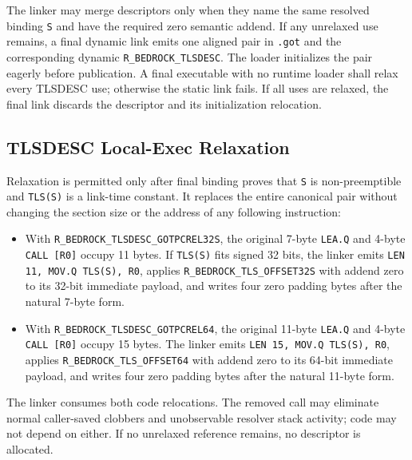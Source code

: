 \documentclass[10pt,twoside]{article}
\begin{document}
The linker may merge descriptors only when they name the same resolved binding
\texttt{S} and have the required zero semantic addend. If any unrelaxed use
remains, a final dynamic link emits one aligned pair in \texttt{.got} and the
corresponding dynamic \texttt{R\_BEDROCK\_TLSDESC}. The loader initializes the
pair eagerly before publication. A final executable with no runtime loader
shall relax every TLSDESC use; otherwise the static link fails. If all uses are
relaxed, the final link discards the descriptor and its initialization
relocation.

\subsection{TLSDESC Local-Exec Relaxation}
Relaxation is permitted only after final binding proves that \texttt{S} is
non-preemptible and \texttt{TLS(S)} is a link-time constant. It replaces the
entire canonical pair without changing the section size or the address of any
following instruction:
\begin{itemize}\raggedright
\item With \texttt{R\_BEDROCK\_TLSDESC\_GOTPCREL32S}, the original
      7-byte \texttt{LEA.Q} and 4-byte \texttt{CALL [R0]} occupy 11 bytes. If
      \texttt{TLS(S)} fits signed 32 bits, the linker emits
      \texttt{LEN 11, MOV.Q TLS(S), R0}, applies
      \texttt{R\_BEDROCK\_TLS\_OFFSET32S} with addend zero to its 32-bit
      immediate payload, and writes four zero padding bytes after the natural
      7-byte form.
\item With \texttt{R\_BEDROCK\_TLSDESC\_GOTPCREL64}, the original
      11-byte \texttt{LEA.Q} and 4-byte \texttt{CALL [R0]} occupy 15 bytes. The
      linker emits \texttt{LEN 15, MOV.Q TLS(S), R0}, applies
      \texttt{R\_BEDROCK\_TLS\_OFFSET64} with addend zero to its 64-bit
      immediate payload, and writes four zero padding bytes after the natural
      11-byte form.
\end{itemize}
The linker consumes both code relocations. The removed call may eliminate
normal caller-saved clobbers and unobservable resolver stack activity; code may
not depend on either. If no unrelaxed reference remains, no descriptor is
allocated.

\clearpage
\end{document}
